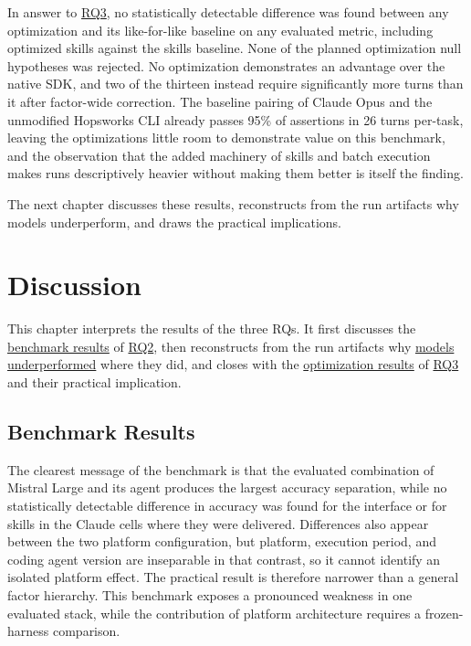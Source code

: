 \documentclass[
english,                 %
bibtex,                  %
]{kththesis}
\numberwithin{listing}{chapter}
\begin{document}
In answer to \hyperref[rq3]{RQ3}, no statistically detectable difference was found between any optimization and its like-for-like baseline on any evaluated metric, including optimized skills against the skills baseline. None of the planned optimization null hypotheses was rejected. No optimization demonstrates an advantage over the native \gls{SDK}, and two of the thirteen instead require significantly more turns than it after factor-wide correction. The baseline pairing of Claude Opus and the unmodified Hopsworks \gls{CLI} already passes 95\% of assertions in 26 turns per-task, leaving the optimizations little room to demonstrate value on this benchmark, and the observation that the added machinery of skills and batch execution makes runs descriptively heavier without making them better is itself the finding.

The next chapter discusses these results, reconstructs from the run artifacts why models underperform, and draws the practical implications.

\cleardoublepage

\chapter{Discussion}
\label{ch:discussion}
\glsresetall

This chapter interprets the results of the three \glspl{RQ}. It first discusses the \hyperref[sec:disc_benchmark_results]{benchmark results} of \hyperref[rq2]{RQ2}, then reconstructs from the run artifacts why \hyperref[sec:disc_model_underperformance]{models underperformed} where they did, and closes with the \hyperref[sec:disc_optimization_results]{optimization results} of \hyperref[rq3]{RQ3} and their practical implication.

\section{Benchmark Results}
\label{sec:disc_benchmark_results}
\glsresetall

The clearest message of the benchmark is that the evaluated combination of Mistral Large and its agent produces the largest accuracy separation, while no statistically detectable difference in accuracy was found for the interface or for skills in the Claude cells where they were delivered. Differences also appear between the two platform configuration, but platform, execution period, and coding agent version are inseparable in that contrast, so it cannot identify an isolated platform effect. The practical result is therefore narrower than a general factor hierarchy. This benchmark exposes a pronounced weakness in one evaluated stack, while the contribution of platform architecture requires a frozen-harness comparison.
\end{document}
